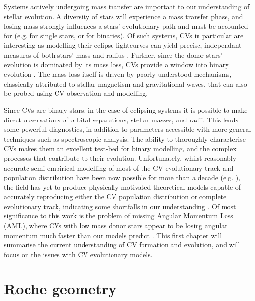 Systems actively undergoing mass transfer are important to our understanding of stellar evolution. A diversity of stars will experience a mass transfer phase, and losing mass strongly influences a stars' evolutionary path and must be accounted for (e.g. \citealt{renzini1981, smith2014} for single stars, or \citealt{hurley2002} for binaries). Of such systems, CVs in particular are interesting as modelling their eclipse lightcurves can yield precise, independant measures of both stars' mass and radius \citep{wood1986,Littlefair2008,Savoury2011}. Further, since the donor stars' evolution is dominated by its mass loss, CVs provide a window into binary evolution \citep{knigge2006}.
The mass loss itself is driven by poorly-understood mechanisms, classically attributed to stellar magnetism and gravitational waves, that can also be probed using CV observation and modelling.

Since CVs are binary stars, in the case of eclipsing systems it is possible to make direct observations of orbital separations, stellar masses, and radii. This lends some powerful diagnostics, in addition to parameters accessible with more general techniques such as spectroscopic analysis.
The ability to thoroughly characterise CVs makes them an excellent test-bed for binary modelling, and the complex processes that contribute to their evolution.
Unfortunately, whilst reasonably accurate semi-empirical modelling of most of the CV evolutionary track and population distribution have been now possible for more than a decade (e.g. \citealt{knigge11,Paxton_2015}), the field has yet to produce physically motivated theoretical models capable of accurately reproducing either the CV population distribution or complete evolutionary track, indicating some shortfalls in our understanding \citep{schreiber2015,Schreiber2016}. 
Of most significance to this work is the problem of missing Angular Momentum Loss (AML), where CVs with low mass donor stars appear to be losing angular momentum much faster than our models predict \citep{Schreiber2016}. This first chapter will summarise the current understanding of CV formation and evolution, and will focus on the issues with CV evolutionary models.


\section{Roche geometry}
\label{sect:introduction:Roche geometry}

